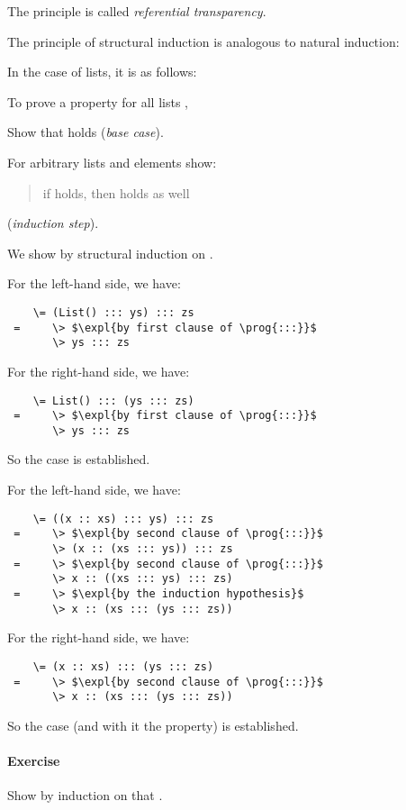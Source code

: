 \documentclass[a4paper,12pt,twoside,titlepage]{book}
\newcommand{\exercise}{\paragraph{Exercise}}
\begin{document}
{The principle is called {\em\emph{referential transparency}}.
\es
{}

The principle of structural induction is analogous to natural induction:

In the case of lists, it is as follows:

To prove a property  for all lists ,
\be
\item Show that  holds (\emph{base case}).
\item For arbitrary lists  and elements  
      show:
\begin{quote}
     if  holds, then  holds as well
\end{quote}
(\emph{induction step}).
\ee

\es
{}

We show  by structural induction
on .

For the left-hand side, we have:
\begin{lstlisting}
    \= (List() ::: ys) ::: zs
 =     \> $\expl{by first clause of \prog{:::}}$
       \> ys ::: zs
\end{lstlisting}
For the right-hand side, we have:
\begin{lstlisting}
    \= List() ::: (ys ::: zs)
 =     \> $\expl{by first clause of \prog{:::}}$
       \> ys ::: zs
\end{lstlisting}
So the case is established.

\es
\bs
{} 

For the left-hand side, we have:
\begin{lstlisting}
    \= ((x :: xs) ::: ys) ::: zs
 =     \> $\expl{by second clause of \prog{:::}}$
       \> (x :: (xs ::: ys)) ::: zs
 =     \> $\expl{by second clause of \prog{:::}}$
       \> x :: ((xs ::: ys) ::: zs)
 =     \> $\expl{by the induction hypothesis}$
       \> x :: (xs ::: (ys ::: zs))
\end{lstlisting}

For the right-hand side, we have:
\begin{lstlisting}
    \= (x :: xs) ::: (ys ::: zs)
 =     \> $\expl{by second clause of \prog{:::}}$
       \> x :: (xs ::: (ys ::: zs))
\end{lstlisting}
So the case (and with it the property) is established.

\exercise
Show by induction on  that .
\es
{}

}
\end{document}
